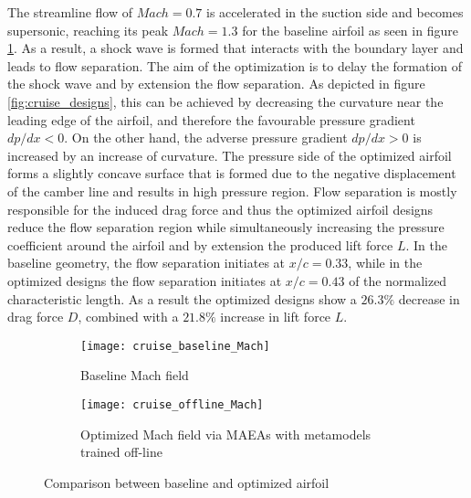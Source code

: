 The streamline flow of $Mach \!= \!0.7 $ is accelerated in the 
suction side and becomes supersonic, reaching its peak $Mach 
\!= \!1.3$ for the baseline airfoil as seen in figure 
\ref{fig:cruise_before_after}. As a result, a shock wave is
formed that interacts with the boundary layer and leads to flow 
separation. The aim of the optimization is to delay the formation 
of the shock wave and by extension the flow separation. As depicted 
in figure \ref{fig:cruise_designs}, this can be achieved by 
decreasing the curvature near the leading edge of the 
airfoil, and therefore the favourable pressure gradient 
$dp/dx < 0$. On the other hand, the adverse pressure gradient 
$dp/dx > 0$ is increased by an increase of curvature. The 
pressure side of the optimized airfoil forms a slightly concave 
surface that is formed due to the negative displacement of the 
camber line and results in high pressure region. Flow separation is 
mostly responsible for the induced drag force and thus the 
optimized airfoil designs reduce the flow separation region while
simultaneously increasing the pressure coefficient around the 
airfoil and by extension the produced lift force $L$. In the 
baseline geometry, the flow separation initiates at $x/c \!= \!
0.33$, while in the optimized designs the flow separation initiates 
at $x/c \!= \!0.43$ of the normalized characteristic length. 
As a result the optimized designs show a $26.3 \%$ decrease in drag 
force $D$, combined with a $21.8 \%$ increase in lift force $L$.

\newpage


\begin{figure}[h!]
\centering
	\begin{subfigure}[b]{0.49\textwidth}
	\centering
	\caption{Baseline Mach field}
	\texttt{[image: cruise\_baseline\_Mach]} 
	\end{subfigure}
	\hfill
	\begin{subfigure}[b]{0.49\textwidth}
	\centering
	\caption{Optimized Mach field via MAEAs with metamodels trained 
	off-line}
	\texttt{[image: cruise\_offline\_Mach]}   
	\end{subfigure}
\caption{Comparison between baseline and optimized airfoil} 
\label{fig:cruise_before_after}
\end{figure}


